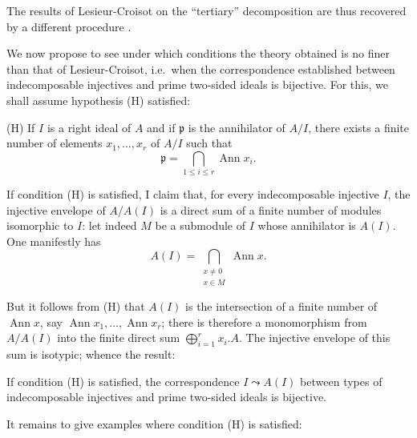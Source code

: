 The results of Lesieur-Croisot on the ``tertiary'' decomposition are
thus recovered by a different procedure \cite{lesieur-croisot-2}.

We now propose to see under which conditions the theory obtained is no
finer than that of Lesieur-Croisot, i.e.\ when the correspondence
established between indecomposable injectives and prime two-sided ideals
is bijective. For this, we shall assume hypothesis (H) satisfied:

(H) If $I$ is a right ideal of $A$ and if $\mathfrak{p}$ is the
annihilator of $A/I$, there exists a finite number of elements
$x_1, \ldots, x_r$ of $A/I$ such that
\[
\mathfrak{p} = \bigcap_{1 \le i \le r} \operatorname{Ann} x_i.
\]

If condition (H) is satisfied, I claim that, for every indecomposable
injective $I$, the injective envelope of $A/A(I)$ is a direct sum of a
finite number of modules isomorphic to $I$: let indeed $M$ be a
submodule of $I$ whose annihilator is $A(I)$. One manifestly has
\[
A(I) = \bigcap_{\substack{x \ne 0 \\ x \in M}} \operatorname{Ann} x.
\]

But it follows from (H) that $A(I)$ is the intersection of a finite
number of $\operatorname{Ann} x$, say
$\operatorname{Ann} x_1, \ldots, \operatorname{Ann} x_r$; there is
therefore a monomorphism from $A/A(I)$ into the finite direct sum
$\bigoplus_{i=1}^{r} x_i.A$. The injective envelope of this sum is
isotypic; whence the result:

\begin{lemma}
If condition (H) is satisfied, the correspondence $I \leadsto A(I)$
between types of indecomposable injectives and prime two-sided ideals
is bijective.
\end{lemma}

It remains to give examples where condition (H) is satisfied:

